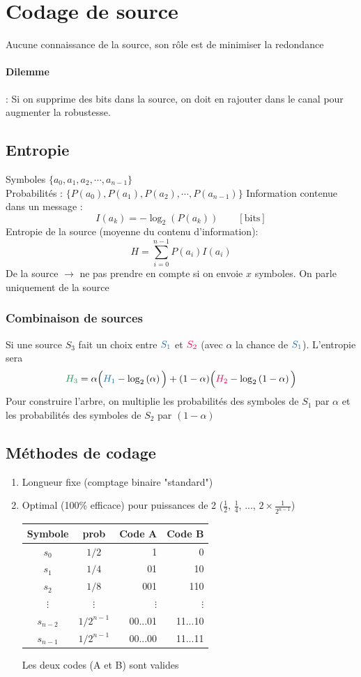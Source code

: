 \documentclass[resume]{subfiles}
\begin{document}
\section{Codage de source}
Aucune connaissance de la source, son rôle est de minimiser la redondance
\paragraph{Dilemme} : Si on supprime des bits dans la source, on doit en rajouter dans le canal pour augmenter la robustesse.
\subsection{Entropie}
Symboles $\lbrace a_0, a_1, a_2, \cdots, a_{n-1}\rbrace$\\
Probabilités : $\lbrace P(a_0), P(a_1), P(a_2), \cdots, P(a_{n-1})\rbrace$
Information contenue dans un message :
$$I(a_k)=-\log_2(P(a_k))\qquad [\text{bits}]$$
Entropie de la source (moyenne du contenu d'information):
$$H=\sum_{i=0}^{n-1}P(a_i)I(a_i)$$
De la source $\to$ ne pas prendre en compte si on envoie $x$ symboles. On parle uniquement de la source
\subsubsection{Combinaison de sources}
Si une source $S_3$ fait un choix entre $\textcolor{RoyalBlue}{S_1}$ et $\textcolor{OrangeRed}{S_2}$ (avec $\alpha$ la chance de $\textcolor{RoyalBlue}{S_1}$). L'entropie sera
$$\textcolor{ForestGreen}{H_3}=\alpha\Big(\textcolor{RoyalBlue}{H_1}-\log_2\left(\alpha\right)\Big)+(1-\alpha)\Big(\textcolor{OrangeRed}{H_2}-\log_2\left(1-\alpha\right)\Big)$$
Pour construire l'arbre, on multiplie les probabilités des symboles de $S_1$ par $\alpha$ et les probabilités des symboles de $S_2$ par $(1-\alpha)$
\subsection{Méthodes de codage}
\begin{enumerate}
\item Longueur fixe (comptage binaire "standard")
\item Optimal (100\% efficace) pour puissances de 2 ($\frac{1}{2}$, $\frac{1}{4}$, ..., $2\times \frac{1}{2^{n-1}}$)
\begin{center}
\begin{tabular}{ccrr}
Symbole & prob & Code A & Code B\\\hline
$s_0$ & $1/2$ & 1 & 0\\
$s_1$ & $1/4$ & 01 & 10\\
$s_2$ & $1/8$ & 001 & 110\\
$\vdots$ & $\vdots$& $\vdots$&$\vdots$ \\
$s_{n-2}$ & $1/2^{n-1}$ & 00...01 & 11...10\\
$s_{n-1}$ & $1/2^{n-1}$ & 00...00 & 11...11\\
\end{tabular}
\end{center}
Les deux codes (A et B) sont valides
\end{enumerate}
\end{document}
